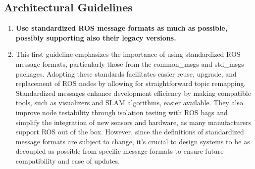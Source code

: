 \documentclass[%
paper=A4,               %
twoside=true,           %
openright,              %
11pt,                   %
bibliography=totoc,     %
titlepage=on,           %
DIV=12,                 %
BCOR=1.5cm,             %
parskip=half,            %
final
]{scrreprt}
\begin{document}
	\subsection{Architectural Guidelines}
	\label{subsec:Guidelines}
	\begin{enumerate}[leftmargin=9mm, align=left]
		\item \textbf{Use standardized ROS message formats as much as possible, possibly supporting also their legacy versions.} 
		\item[]This first guideline emphasizes the importance of using standardized ROS message formats, particularly those from the common\_msgs and std\_msgs packages. Adopting these standards facilitates easier reuse, upgrade, and replacement of ROS nodes by allowing for straightforward topic remapping. Standardized messages enhance development efficiency by making compatible tools, such as visualizers and SLAM algorithms, easier available. They also improve node testability through isolation testing with ROS bags and simplify the integration of new sensors and hardware, as many manufacturers support ROS out of the box. However, since the definitions of standardized message formats are subject to change, it's crucial to design systems to be as decoupled as possible from specific message formats to ensure future compatibility and ease of updates. \autocite{malavoltaHowYouArchitect2020}
		

\end{enumerate}
\end{document}
